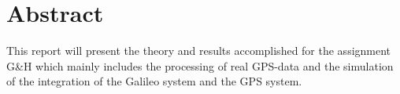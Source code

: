 \chapter{Abstract}
%
%





This report will present the theory and results accomplished for the assignment G\&H which mainly includes the processing of real GPS-data and the simulation of the integration of the Galileo system and the GPS system.


